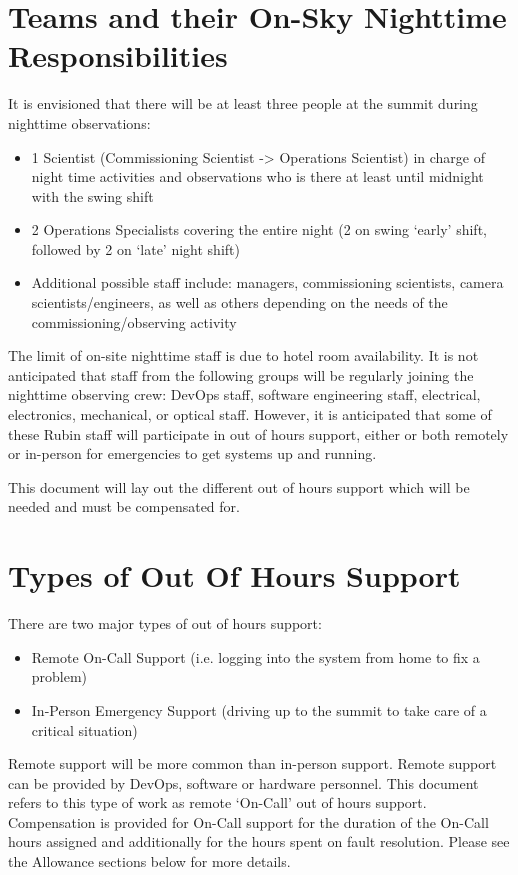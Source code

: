 \section{Teams and their On-Sky Nighttime Responsibilities}

It is envisioned that there will be at least three people at the summit during nighttime observations:

\begin{itemize}
    \item 1 Scientist (Commissioning Scientist -> Operations Scientist) in charge of night time activities and observations who is there at least until midnight with the swing shift
    \item 2 Operations Specialists covering the entire night (2 on swing `early' shift, followed by 2 on `late' night shift)
    \item Additional possible staff include: managers, commissioning scientists, camera scientists/engineers, as well as others depending on the needs of the commissioning/observing activity
\end{itemize}

The limit of on-site nighttime staff is due to hotel room availability.  It is not anticipated that staff from the following groups will be regularly joining the nighttime observing crew: DevOps staff, software engineering staff, electrical, electronics, mechanical, or optical staff.
However, it is anticipated that some of these Rubin staff will participate in out of hours support, either or both remotely or in-person for emergencies to get systems up and running.

This document will lay out the different out of hours support which will be needed and must be compensated for.

\section{Types of Out Of Hours Support}

There are two major types of out of hours support:

\begin{itemize}
    \item Remote On-Call Support (i.e. logging into the system from home to fix a problem)
    \item In-Person Emergency Support (driving up to the summit to take care of a critical situation)
\end{itemize}

Remote support will be more common than in-person support.  Remote support can be provided by DevOps, software or hardware personnel.  This document refers to this type of work as remote `On-Call' out of hours support. Compensation is provided for On-Call support for the duration of the On-Call hours assigned and additionally for the hours spent on fault resolution.  Please see the Allowance sections below for more details.

